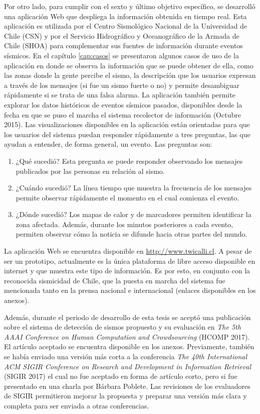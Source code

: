 \begin{conclusion}
Por otro lado, para cumplir con el sexto y último objetivo específico, se desarrolló una aplicación Web que despliega la información obtenida en tiempo real. Esta aplicación es utilizada por el Centro Sismológico Nacional de la Universidad de Chile (CSN) y por el Servicio Hidrográfico y Oceanográfico de la Armada de Chile (SHOA) para complementar sus fuentes de información durante eventos sísmicos. 
En el capítulo \ref{cap:casos} se presentaron algunos casos de uso de la aplicación en donde se observa la información que se puede obtener de ella, como las zonas donde la gente percibe el sismo, la descripción que los usuarios expresan a través de los mensajes (si fue un sismo fuerte o no) y permite desambiguar rápidamente si se trata de una falsa alarma.
%
La aplicación también permite explorar los datos históricos de eventos sísmicos pasados, disponibles desde la fecha en que se puso el marcha el sistema recolector de información (Octubre 2015). Las visualizaciones disponibles en la aplicación están orientadas para que los usuarios del sistema puedan responder rápidamente a tres preguntas, las que ayudan a entender, de forma general, un evento. Las preguntas son: 
\begin{enumerate}
\item ¿Qué sucedió? Esta pregunta se puede responder observando los mensajes publicados por las personas en relación al sismo.
\item ¿Cuándo sucedió? La línea tiempo que muestra la frecuencia de los mensajes permite observar rápidamente el momento en el cual comienza el evento. 
\item ¿Dónde sucedió? Los mapas de calor y de marcadores permiten identificar la zona afectada. Además, durante los minutos posteriores a cada evento, permiten observar cómo la noticia se difunde hacia otras partes del mundo.
\end{enumerate} 

La aplicación Web se encuentra disponible en \url{http://www.twicalli.cl}.
%
A pesar de ser un prototipo, actualmente es la única plataforma de libre acceso disponible en internet y que muestra este tipo de información. 
%
Es por esto, en conjunto con la reconocida sismicidad de Chile, que la puesta en marcha del sistema fue mencionada tanto en la prensa nacional e internacional (enlaces disponibles en los anexos). 


Además, durante el periodo de desarrollo de esta tesis se aceptó una publicación sobre el sistema de detección de sismos propuesto y su evaluación en \textit{The 5th AAAI Conference on Human Computation and Crowdsourcing} (HCOMP 2017). 
%
El artículo aceptado se encuentra disponible en los anexos. 
%
Previamente, también se había enviado una versión más corta a la conferencia \textit{The 40th International ACM SIGIR Conference on Research and Development in Information Retrieval} (SIGIR 2017) el cual no fue aceptado en forma de artículo corto, pero si fue presentado en una charla por Bárbara Poblete.
%
Las revisiones de los evaluadores de SIGIR permitieron mejorar la propuesta y preparar una versión más clara y completa para ser enviada a otras conferencias.


\end{conclusion}
